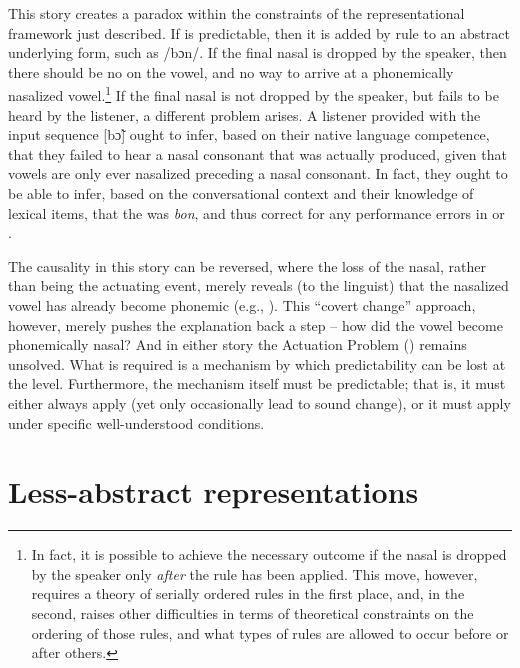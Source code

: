 This story creates a paradox within the constraints of the representational
framework just described. If  is predictable, then it
is added by rule to an abstract underlying form, such as {/bɔn/}.
If the final nasal is dropped by the speaker, then there should be
no  on the vowel, and no way to arrive at a phonemically
nasalized vowel.\footnote{In fact, it is possible to achieve the necessary outcome if the nasal
is dropped by the speaker only \emph{after} the  rule has
been applied. This move, however, requires a theory of serially ordered
rules in the first place, and, in the second, raises other difficulties
in terms of theoretical constraints on the ordering of those rules,
and what types of rules are allowed to occur before or after others.}
If the final nasal is not dropped by the speaker, but fails to be
heard by the listener, a different problem arises. A listener provided
with the input sequence {[bɔ̃]} ought to infer, based on
their native language competence, that they failed to hear a nasal
consonant that was actually produced, given that vowels are only ever
nasalized preceding a nasal consonant. In fact, they ought to be able
to infer, based on the conversational context and their knowledge
of lexical items, that the  was \textit{bon}, and thus correct
for any performance errors in  or .

The causality in this story can be reversed, where the loss of the
nasal, rather than being the actuating event, merely reveals (to the
linguist) that the nasalized vowel has already become phonemic (e.g.,
\citealt{Janda2003}). This ``covert change'' approach, however, merely
pushes the explanation back a step – how did the vowel become phonemically
nasal? And in either story the Actuation Problem (\citealt{Labov1968})
remains unsolved. What is required is a mechanism by which predictability
can be lost at the  level. Furthermore, the mechanism itself
must be predictable; that is, it must either always apply (yet only
occasionally lead to sound change), or it must apply under specific
well-understood conditions.

\section{\label{sec:Less-abstract-Representations}Less-abstract representations}

